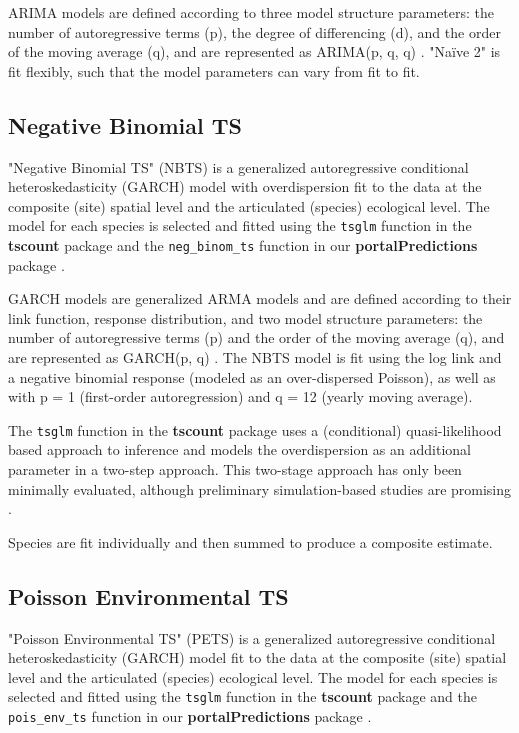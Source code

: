 \documentclass{article}
\def\code#1{\texttt{#1}}
\begin{document}
ARIMA models are defined according to three model structure parameters: the number of autoregressive terms (p), the degree of differencing (d), and the order of the moving average (q), and are represented as ARIMA(p, q, q) \cite{boxjenkins}. "Na\"{i}ve 2" is fit flexibly, such that the model parameters can vary from fit to fit.

\subsection{Negative Binomial TS}
\label{subsec:neg_binom_ts}

"Negative Binomial TS" (NBTS) is a generalized autoregressive conditional heteroskedasticity (GARCH) model with overdispersion fit to the data at the composite (site) spatial level and the articulated (species) ecological level. The model for each species is selected and fitted using the \code{tsglm} function in the \textbf{tscount} package \cite{tscount} and the \code{neg\_binom\_ts} function in our \textbf{portalPredictions} package \cite{portalpredictions}.

GARCH models are generalized ARMA models and are defined according to their link function, response distribution, and two model structure parameters: the number of autoregressive terms (p) and the order of the moving average (q), and are represented as GARCH(p, q) \cite{tscount}. The NBTS model is fit using the log link and a negative binomial response (modeled as an over-dispersed Poisson), as well as with p = 1 (first-order autoregression) and q = 12 (yearly moving average).

The \code{tsglm} function in the \textbf{tscount} package \cite{tscount} uses a (conditional) quasi-likelihood based approach to inference and models the overdispersion as an additional parameter in a two-step approach. This two-stage approach has only been minimally evaluated, although preliminary simulation-based studies are promising \cite{tsglmvignette}.    

Species are fit individually and then summed to produce a composite estimate. 

\subsection{Poisson Environmental TS}
\label{subsec:pois_env_ts}

"Poisson Environmental TS" (PETS) is a generalized autoregressive conditional heteroskedasticity (GARCH) model fit to the data at the composite (site) spatial level and the articulated (species) ecological level. The model for each species is selected and fitted using the \code{tsglm} function in the \textbf{tscount} package \cite{tscount} and the \code{pois\_env\_ts} function in our \textbf{portalPredictions} package \cite{portalpredictions}.
\end{document}
